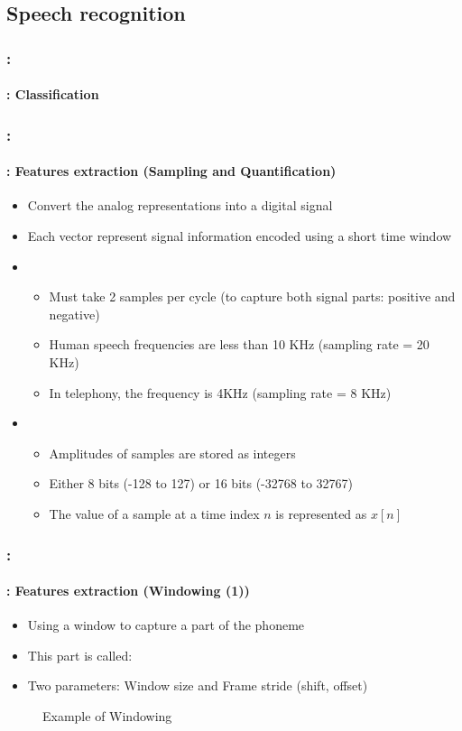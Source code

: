 \documentclass[xcolor=table]{beamer}
\begin{document}
\subsection{Speech recognition}

\begin{frame}
	\frametitle{\insertshortsubtitle: \insertsection}
	\framesubtitle{\insertsubsection: Classification}
	
	
\end{frame}


\begin{frame}
	\frametitle{\insertshortsubtitle: \insertsection}
	\framesubtitle{\insertsubsection: Features extraction (Sampling and Quantification)}
	
	\begin{itemize}
		\item Convert the analog representations into a digital signal
		\item Each vector represent signal information encoded using a short time window
		\item {}
		\begin{itemize}
			\item Must take 2 samples per cycle (to capture both signal parts: positive and negative)
			\item Human speech frequencies are less than 10 KHz (sampling rate = 20 KHz)
			\item In telephony, the frequency is 4KHz (sampling rate = 8 KHz)
		\end{itemize}
		\item {}
		\begin{itemize}
			\item Amplitudes of samples are stored as integers
			\item Either 8 bits (-128 to 127) or 16 bits (-32768 to 32767)
			\item The value of a sample at a time index $n$ is represented as $x[n]$
		\end{itemize}
	\end{itemize}

\end{frame}

\begin{frame}
	\frametitle{\insertshortsubtitle: \insertsection}
	\framesubtitle{\insertsubsection: Features extraction (Windowing (1))}
	
	\begin{itemize}
		\item Using a window to capture a part of the phoneme
		\item This part is called: 
		\item Two parameters: Window size and Frame stride (shift, offset)
	\end{itemize}

	\begin{figure}
		\centering
		\caption{Example of Windowing \cite{2020-jurafsky-martin}}
	\end{figure}

\end{frame}
\end{document}
